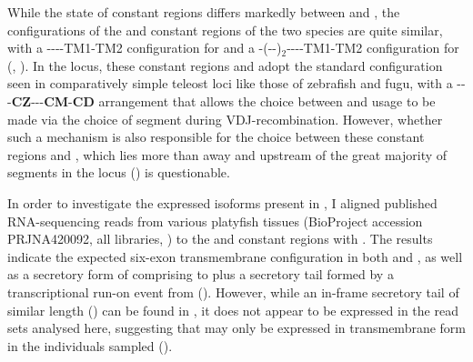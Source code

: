 \begin{table}
	\centering
	
	\label{tab:xma-cz-aln}
\end{table}

While the state of  constant regions differs markedly between \Xma and \Nfu, the configurations of the  and  constant regions of the two species are quite similar, with a {----TM1-TM2} configuration for  and a {-(--)$_2$----TM1-TM2} configuration for  (, ). In the \Xma locus, these constant regions and  adopt the standard configuration seen in comparatively simple teleost \igh{} loci like those of zebrafish and fugu, with a {\vh-\dh-\jh-\textbf{CZ}-\dh-\jh-\textbf{CM}-\textbf{CD}} arrangement that allows the choice between  and  usage to be made via the choice of \dh segment during VDJ-recombination. However, whether such a mechanism is also responsible for the choice between these constant regions and , which lies more than  away and upstream of the great majority of \vh segments in the locus () is questionable.

In order to investigate the expressed isoforms present in \Xma, I aligned published RNA-sequencing reads from various platyfish tissues (BioProject accession PRJNA420092, all libraries, ) to the  and  constant regions with . The results indicate the expected six-exon transmembrane configuration in both  and , as well as a secretory form of  comprising  to  plus a  secretory tail formed by a transcriptional run-on event from  (). However, while an in-frame secretory tail of similar length () can be found in , it does not appear to be expressed in the read sets analysed here, suggesting that  may only be expressed in transmembrane form in the individuals sampled ().

